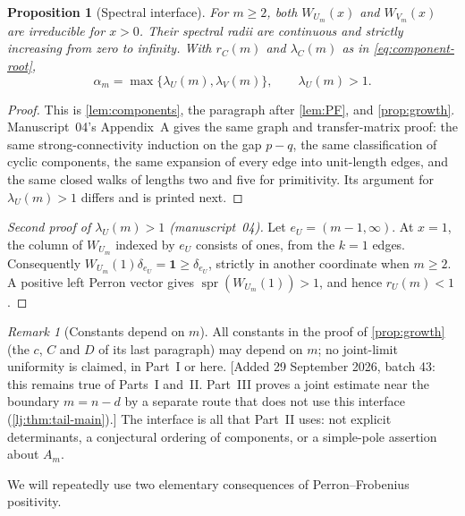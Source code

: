 \documentclass[11pt,a4paper]{article}
\newtheorem{proposition}[proposition]{Proposition}
\theoremstyle{definition}\newaliascnt{definition}{theorem}
\theoremstyle{remark}\newaliascnt{remark}{theorem}
\newtheorem{remark}[remark]{Remark}
\newcommand{\spr}{\operatorname{spr}}
\newcommand{\one}{\mathbf 1}
\begin{document}
\begin{proposition}[Spectral interface]\label{crem:prop:spectral}
For $m\ge2$, both $W_{U_m}(x)$ and $W_{V_m}(x)$ are irreducible for $x>0$.
Their spectral radii are continuous and strictly increasing from zero to
infinity. With $r_C(m)$ and $\lambda_C(m)$ as in \eqref{eq:component-root},
\begin{equation}
 \alpha_m=\max\{\lambda_U(m),\lambda_V(m)\},
 \qquad \lambda_U(m)>1.
 \label{crem:eq:spectral-interface}
\end{equation}
\end{proposition}
\begin{proof}
This is \cref{lem:components}, the paragraph after \cref{lem:PF}, and
\cref{prop:growth}. Manuscript~04's Appendix~A gives the same graph and
transfer-matrix proof: the same strong-connectivity induction on the gap
$p-q$, the same classification of cyclic components, the same expansion of
every edge into unit-length edges, and the same closed walks of lengths two
and five for primitivity. Its argument for $\lambda_U(m)>1$ differs and is
printed next.
\end{proof}

\begin{proof}[Second proof of $\lambda_U(m)>1$ (manuscript~04)]
Let $e_U=(m-1,\infty)$. At $x=1$, the column of $W_{U_m}$ indexed by $e_U$
consists of ones, from the $k=1$ edges. Consequently
$W_{U_m}(1)\delta_{e_U}=\one\ge\delta_{e_U}$, strictly in another coordinate
when $m\ge2$. A positive left Perron vector gives $\spr(W_{U_m}(1))>1$, and
hence $r_U(m)<1$.
\end{proof}

\begin{remark}[Constants depend on $m$]\label{crem:rem:fixed-m}
All constants in the proof of \cref{prop:growth} (the $c$, $C$ and $D$ of
its last paragraph) may depend on $m$; no joint-limit uniformity is claimed,
in Part~I or here. [Added 29 September 2026, batch 43: this remains true of
Parts~I and~II. Part~III proves a joint estimate near the boundary $m=n-d$
by a separate route that does not use this interface
(\cref{lj:thm:tail-main}).] The interface is all that Part~II uses: not explicit
determinants, a conjectural ordering of components, or a simple-pole
assertion about $A_m$.
\end{remark}

We will repeatedly use two elementary consequences of Perron--Frobenius
positivity.
\end{document}
